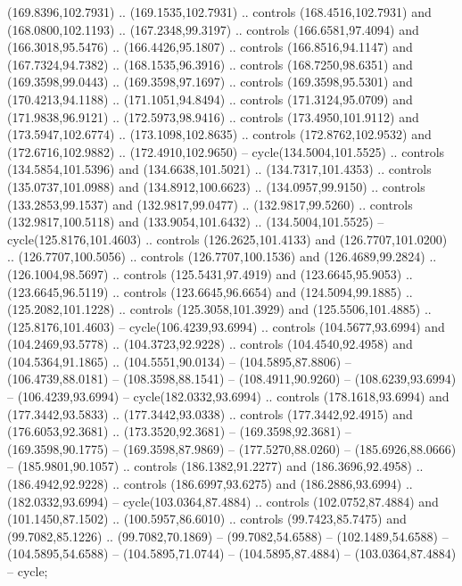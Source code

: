 \begin{scope}[cm={{1.25,0.0,0.0,-1.25,(0.0,442.91375)}}]
    (169.8396,102.7931) .. (169.1535,102.7931) .. controls (168.4516,102.7931) and
    (168.0800,102.1193) .. (167.2348,99.3197) .. controls (166.6581,97.4094) and
    (166.3018,95.5476) .. (166.4426,95.1807) .. controls (166.8516,94.1147) and
    (167.7324,94.7382) .. (168.1535,96.3916) .. controls (168.7250,98.6351) and
    (169.3598,99.0443) .. (169.3598,97.1697) .. controls (169.3598,95.5301) and
    (170.4213,94.1188) .. (171.1051,94.8494) .. controls (171.3124,95.0709) and
    (171.9838,96.9121) .. (172.5973,98.9416) .. controls (173.4950,101.9112) and
    (173.5947,102.6774) .. (173.1098,102.8635) .. controls (172.8762,102.9532) and
    (172.6716,102.9882) .. (172.4910,102.9650) -- cycle(134.5004,101.5525) ..
    controls (134.5854,101.5396) and (134.6638,101.5021) .. (134.7317,101.4353) ..
    controls (135.0737,101.0988) and (134.8912,100.6623) .. (134.0957,99.9150) ..
    controls (133.2853,99.1537) and (132.9817,99.0477) .. (132.9817,99.5260) ..
    controls (132.9817,100.5118) and (133.9054,101.6432) .. (134.5004,101.5525) --
    cycle(125.8176,101.4603) .. controls (126.2625,101.4133) and
    (126.7707,101.0200) .. (126.7707,100.5056) .. controls (126.7707,100.1536) and
    (126.4689,99.2824) .. (126.1004,98.5697) .. controls (125.5431,97.4919) and
    (123.6645,95.9053) .. (123.6645,96.5119) .. controls (123.6645,96.6654) and
    (124.5094,99.1885) .. (125.2082,101.1228) .. controls (125.3058,101.3929) and
    (125.5506,101.4885) .. (125.8176,101.4603) -- cycle(106.4239,93.6994) ..
    controls (104.5677,93.6994) and (104.2469,93.5778) .. (104.3723,92.9228) ..
    controls (104.4540,92.4958) and (104.5364,91.1865) .. (104.5551,90.0134) --
    (104.5895,87.8806) -- (106.4739,88.0181) -- (108.3598,88.1541) --
    (108.4911,90.9260) -- (108.6239,93.6994) -- (106.4239,93.6994) --
    cycle(182.0332,93.6994) .. controls (178.1618,93.6994) and (177.3442,93.5833)
    .. (177.3442,93.0338) .. controls (177.3442,92.4915) and (176.6053,92.3681) ..
    (173.3520,92.3681) -- (169.3598,92.3681) -- (169.3598,90.1775) --
    (169.3598,87.9869) -- (177.5270,88.0260) -- (185.6926,88.0666) --
    (185.9801,90.1057) .. controls (186.1382,91.2277) and (186.3696,92.4958) ..
    (186.4942,92.9228) .. controls (186.6997,93.6275) and (186.2886,93.6994) ..
    (182.0332,93.6994) -- cycle(103.0364,87.4884) .. controls (102.0752,87.4884)
    and (101.1450,87.1502) .. (100.5957,86.6010) .. controls (99.7423,85.7475) and
    (99.7082,85.1226) .. (99.7082,70.1869) -- (99.7082,54.6588) --
    (102.1489,54.6588) -- (104.5895,54.6588) -- (104.5895,71.0744) --
    (104.5895,87.4884) -- (103.0364,87.4884) -- cycle;
\end{scope}
